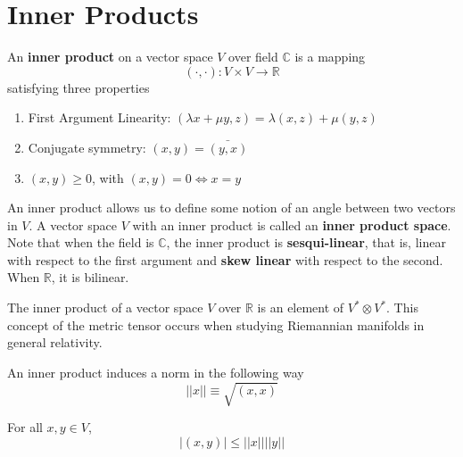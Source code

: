 \section{Inner Products}

  \begin{definition}
    An \textbf{inner product} on a vector space $V$ over field $\mathbb{C}$ is a mapping 
    \begin{equation}
      (\cdot, \cdot): V \times V \longrightarrow \mathbb{R}
    \end{equation}
    satisfying three properties 
    \begin{enumerate}
      \item First Argument Linearity: $(\lambda x + \mu y, z) = \lambda (x, z) + \mu (y, z)$
      \item Conjugate symmetry: $(x, y) = \bar{(y, x)}$
      \item $(x, y) \geq 0$, with $(x, y) = 0 \iff x = y$
    \end{enumerate}
    An inner product allows us to define some notion of an angle between two vectors in $V$. A vector space $V$ with an inner product is called an \textbf{inner product space}. Note that when the field is $\mathbb{C}$, the inner product is \textbf{sesqui-linear}, that is, linear with respect to the first argument and \textbf{skew linear} with respect to the second. When $\mathbb{R}$, it is bilinear. 
  \end{definition}

  The inner product of a vector space $V$ over $\mathbb{R}$ is an element of $V^* \otimes V^*$. This concept of the metric tensor occurs when studying Riemannian manifolds in general relativity. 

  \begin{definition}
    An inner product induces a norm in the following way
    \begin{equation}
      ||x|| \equiv \sqrt{(x,x)} 
    \end{equation}
  \end{definition}

  \begin{theorem}
    For all $x, y \in V$, 
    \begin{equation}
      |(x, y)| \leq ||x|| ||y||
    \end{equation}
  \end{theorem}

